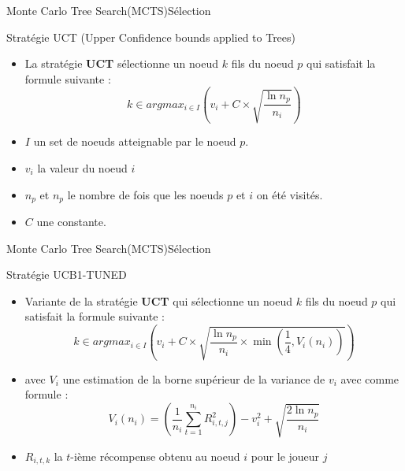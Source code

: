 \begin{frame}{Monte Carlo Tree Search(MCTS)}{Sélection}
	\begin{block}{Stratégie UCT (Upper Confidence bounds applied to Trees)}
		\begin{itemize}
			\item La stratégie \textbf{UCT} sélectionne un noeud $k$ fils du noeud $p$ qui satisfait la formule suivante :
			      $$k \in argmax_{i\in I}\left(v_{i} + C \times \sqrt{\frac{\ln n_{p}}{n_{i}}}\right)$$
			\item $I$ un set de noeuds atteignable par le noeud $p$.
			\item $v_{i}$ la valeur du noeud $i$
			\item $n_{p}$ et $n_{p}$ le nombre de fois que les noeuds $p$ et $i$ on été visités.
			\item $C$ une constante.
		\end{itemize}
	\end{block}
\end{frame}

\begin{frame}{Monte Carlo Tree Search(MCTS)}{Sélection}
	\begin{block}{Stratégie UCB1-TUNED}
		\begin{itemize}
			\item Variante de la stratégie \textbf{UCT} qui sélectionne un noeud $k$ fils du noeud $p$ qui satisfait la formule suivante :
			      $$k \in argmax_{i\in I}\left(v_{i} + C \times \sqrt{\frac{\ln n_{p}}{n_{i}}\times \min(\frac{1}{4}, V_{i}(n_{i}))}\right)$$
			\item avec $V_{i}$ une estimation de la borne supérieur de la variance de $v_{i}$ avec comme formule :
			      $$V_{i}(n_{i}) = \left(\frac{1}{n_{i}}\sum_{t=1}^{n_{i}}R_{i,t,j}^2\right) - v_{i}^2 + \sqrt{\frac{2\ln n_{p}}{n_{i}}}$$
			\item $R_{i,t,k}$ la $t$-ième récompense obtenu au noeud $i$ pour le joueur $j$
		\end{itemize}
	\end{block}
\end{frame}

